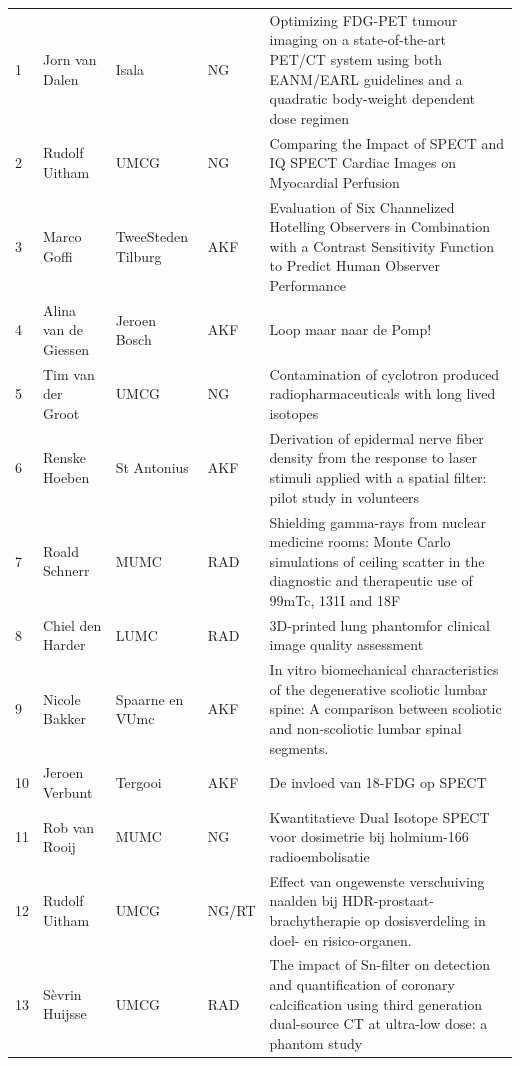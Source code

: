 \documentclass[a4paper,10pt]{report}
\begin{document}

\begin{tabular}{llllp{18cm}}
   1& Jorn van Dalen & Isala & NG & Optimizing FDG-PET tumour imaging on a state-of-the-art PET/CT system using both EANM/EARL guidelines and a quadratic body-weight dependent dose regimen\\
  2&Rudolf Uitham &  UMCG &    NG & Comparing the Impact of SPECT and IQ SPECT Cardiac Images on Myocardial Perfusion\\
  3&Marco Goffi&  TweeSteden Tilburg&   AKF& Evaluation of Six Channelized Hotelling Observers in Combination with a Contrast Sensitivity Function to Predict Human Observer Performance\\
  4&Alina van de Giessen &  Jeroen Bosch &    AKF& Loop maar naar de Pomp!\\
  5&Tim van der Groot &  UMCG &    NG &  Contamination of cyclotron produced radiopharmaceuticals with long lived isotopes\\
  6&Renske Hoeben  &  St Antonius&  AKF& Derivation of epidermal nerve fiber density from the response to laser stimuli applied with a spatial filter: pilot study in volunteers\\
  7&Roald Schnerr&    MUMC & RAD& Shielding gamma-rays from nuclear medicine rooms: Monte Carlo simulations of ceiling scatter in the diagnostic and therapeutic use of 99mTc, 131I and 18F\\
  8&Chiel den Harder  &   LUMC& RAD& 3D-printed lung phantomfor clinical image quality assessment\\
  9&Nicole Bakker &  Spaarne en VUmc&  AKF&  In vitro biomechanical characteristics of the degenerative scoliotic lumbar spine: A comparison between scoliotic and non-scoliotic lumbar spinal segments.\\
  10&Jeroen Verbunt&  Tergooi&  AKF&  De invloed van 18-FDG op SPECT\\
  11&Rob van Rooij  &  MUMC&     NG&  Kwantitatieve Dual Isotope SPECT voor dosimetrie bij holmium-166 radioembolisatie\\
  12&Rudolf Uitham &   UMCG &    NG/RT &   Effect van ongewenste verschuiving naalden bij HDR-prostaat-brachytherapie op dosisverdeling in doel- en risico-organen.\\
  13&Sèvrin Huijsse&   UMCG &    RAD&  The impact of Sn-filter on detection and quantification of coronary calcification using third generation dual-source CT at ultra-low dose: a phantom study\\

\end{tabular}
\end{document}
